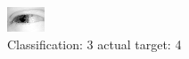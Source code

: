 \begin{figure}[h!]
\begin{center}
\includegraphics[width=0.60\columnwidth]{figures/ID2549_class_3_target_4.png}
\end{center}
\caption{ Classification: 3 actual target: 4}
\label{fig:ID2549_class_3_target_4}
\end{figure}
